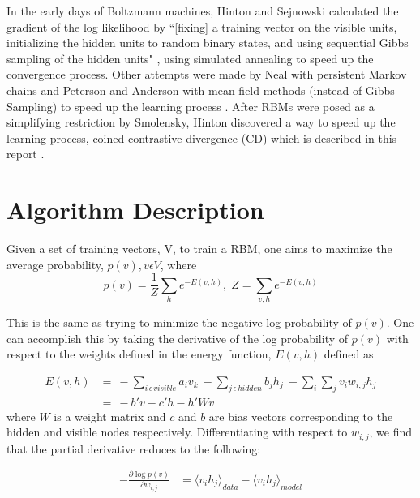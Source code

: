 \documentclass[journal]{IEEEtran}
\begin{document}
In the early days of Boltzmann machines, Hinton and Sejnowski calculated the gradient of the log likelihood by ``[fixing] a training vector on the visible units, initializing the hidden units to random binary states, and using sequential Gibbs sampling of the hidden units" \cite{ackley1985learning}, using simulated annealing to speed up the convergence process.  Other attempts were made by Neal with persistent Markov chains \cite{neal1992connectionist} and Peterson and Anderson with mean-field methods (instead of Gibbs Sampling) to speed up the learning process \cite{peterson1987mean}. After RBMs were posed as a simplifying restriction by Smolensky, Hinton discovered a way to speed up the learning process, coined contrastive divergence (CD) which is described in this report \cite{carreira2005contrastive,hinton2006fast,hinton2010practical}.  

\section{Algorithm Description}
Given a set of training vectors, V, to train a RBM, one aims to maximize the average probability, $p(v), v \epsilon V$, where
\begin{equation}
p(v) = \frac{1}{Z} \sum\limits_{h} e^{-E(v,h)},\;
Z = \sum\limits_{v,h} e^{-E(v,h)}
\end{equation}

This is the same as trying to minimize the negative log probability of $p(v)$. One can accomplish this by taking the derivative of the log probability of $p(v)$ with respect to the weights defined in the energy function, $E(v,h)$ defined as

\begin{equation}
\begin{aligned}
E(v,h) &= \:- \sum\limits_{i \, \epsilon \, visible} a_{i}v_{k} \: - \sum\limits_{j \, \epsilon \, hidden} b_{j}h_{j} \: - \sum\limits_{i}\sum\limits_{j} v_{i}w_{i,j}h_{j}\\
&=\: -b'v - c'h - h'Wv
\end{aligned}
\end{equation} where $W$ is a weight matrix and $c$ and $b$ are bias vectors corresponding to the hidden and visible nodes respectively. Differentiating with respect to $w_{i,j}$, we find that the partial derivative reduces to the following:

\begin{equation}
\begin{aligned}
-\frac{\partial \log p(v)}{\partial w_{i,j}} & = {\langle v_{i} h_{j} \rangle}_{data} - {\langle v_{i} h_{j} \rangle}_{model} \\
\end{aligned}
\end{equation}
\end{document}
